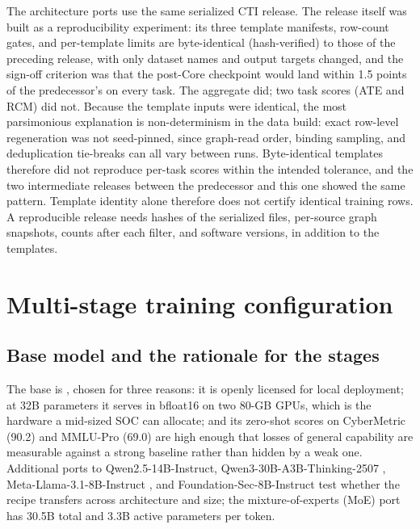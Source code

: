 \documentclass[twocolumn]{svjour3}
\newcommand{\code}[1]{\path{#1}}
\begin{document}
The architecture ports use the same serialized CTI release. The release itself was built as a reproducibility experiment: its three template manifests, row-count gates, and per-template limits are byte-identical (hash-verified) to those of the preceding release, with only dataset names and output targets changed, and the sign-off criterion was that the post-Core checkpoint would land within 1.5 points of the predecessor's on every task. The aggregate did; two task scores (ATE and RCM) did not. Because the template inputs were identical, the most parsimonious explanation is non-determinism in the data build: exact row-level regeneration was not seed-pinned, since graph-read order, binding sampling, and deduplication tie-breaks can all vary between runs. Byte-identical templates therefore did not reproduce per-task scores within the intended tolerance, and the two intermediate releases between the predecessor and this one showed the same pattern. Template identity alone therefore does not certify identical training rows. A reproducible release needs hashes of the serialized files, per-source graph snapshots, counts after each filter, and software versions, in addition to the templates.

\section{Multi-stage training configuration}\label{sec:training}
\subsection{Base model and the rationale for the stages}
The base is \code{Qwen/Qwen2.5-32B-Instruct} \cite{qwen2025qwen25}, chosen for three reasons: it is openly licensed for local deployment; at 32B parameters it serves in bfloat16 on two 80-GB GPUs, which is the hardware a mid-sized SOC can allocate; and its zero-shot scores on CyberMetric (90.2) and MMLU-Pro (69.0) are high enough that losses of general capability are measurable against a strong baseline rather than hidden by a weak one. Additional ports to Qwen2.5-14B-Instruct, Qwen3-30B-A3B-Thinking-2507 \cite{yang2025qwen3}, Meta-Llama-3.1-8B-Instruct \cite{grattafiori2024llama3}, and Foundation-Sec-8B-Instruct \cite{kassianik2025foundationsec} test whether the recipe transfers across architecture and size; the mixture-of-experts (MoE) port has 30.5B total and 3.3B active parameters per token.
\end{document}
